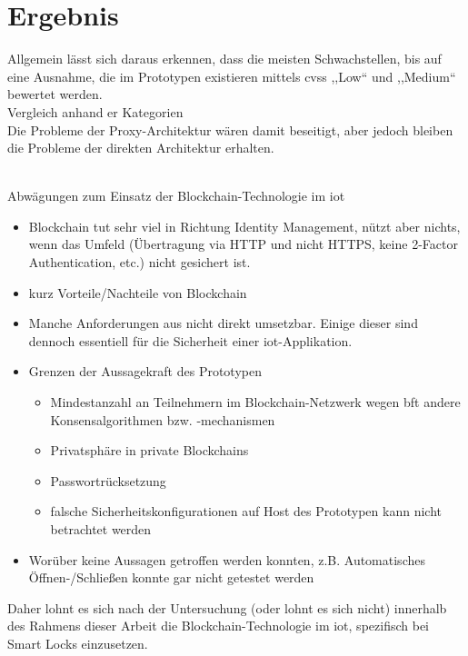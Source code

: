 \section{Ergebnis}
\label{sec:end}
    Allgemein lässt sich daraus erkennen, dass die meisten Schwachstellen, bis auf eine Ausnahme, die im Prototypen existieren mittels \gls{cvss} ,,Low`` und ,,Medium`` bewertet werden.
    \medskip\\
    Vergleich anhand er Kategorien
    \bigskip\\
    Die Probleme der Proxy-Architektur wären damit beseitigt, aber jedoch bleiben die Probleme der direkten Architektur erhalten.

\hspace{0cm}\bigskip\\
    Abwägungen zum Einsatz der Blockchain-Technologie im \gls{iot}
    \begin{itemize}[noitemsep]
        \item Blockchain tut sehr viel in Richtung Identity Management, nützt aber nichts, wenn das Umfeld (Übertragung via HTTP und nicht HTTPS, keine 2-Factor Authentication, etc.) nicht gesichert ist.
        \item kurz Vorteile/Nachteile von Blockchain
        \item Manche Anforderungen aus  nicht direkt umsetzbar.
            Einige dieser sind dennoch essentiell für die Sicherheit einer \gls{iot}-Applikation.
        \item Grenzen der Aussagekraft des Prototypen
		    \begin{itemize}[noitemsep]
		        \item Mindestanzahl an Teilnehmern im Blockchain-Netzwerk wegen \gls{bft} \textrightarrow andere Konsensalgorithmen bzw. -mechanismen
		        \item Privatsphäre in private Blockchains
		        \item Passwortrücksetzung
		        \item falsche Sicherheitskonfigurationen auf Host des Prototypen kann nicht betrachtet werden
		    \end{itemize}
		\item Worüber keine Aussagen getroffen werden konnten, z.B. Automatisches Öffnen-/\-Schließen konnte gar nicht getestet werden
    \end{itemize}
    Daher lohnt es sich nach der Untersuchung (oder lohnt es sich nicht) innerhalb des Rahmens dieser Arbeit die Blockchain-Technologie im \gls{iot}, spezifisch bei Smart Locks einzusetzen.
    
